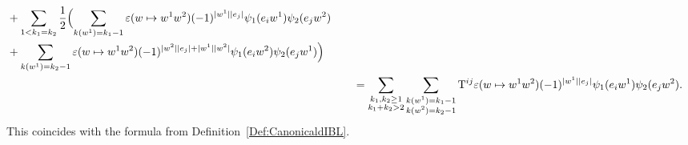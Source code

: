 \documentclass[\MainFolder/Text.tex]{subfiles}
\begin{document}
\begin{Example}
\begin{align*}
\begin{aligned}[t]
&{}+ \sum_{1< k_1 = k_2} \frac{1}{2} \Bigl(\sum_{k(w^1) = k_1 - 1} \varepsilon(w\mapsto w^1 w^2)(-1)^{|w^1||e_j|} \psi_1(e_i w^1) \psi_2(e_j w^2) \\ 
&{}+\sum_{k(w^1) = k_2 - 1} \varepsilon(w\mapsto w^1 w^2) (-1)^{|w^2||e_j| + |w^1||w^2|} \psi_1(e_i w^2) \psi_2(e_j w^1)\Bigr)\end{aligned}\\
&\qquad=\sum_{\substack{k_1, k_2 \ge 1 \\ k_1 + k_2 > 2}} \sum_{\substack{ k(w^1) = k_1 - 1 \\ k(w^2) = k_2 - 1}}  \mathrm{T}^{ij}\varepsilon(w \mapsto w^1 w^2) (-1)^{|w^1||e_j|} \psi_1(e_i w^1) \psi_2(e_j w^2).
\end{align*}
This coincides with the formula from Definition~\ref{Def:CanonicaldIBL}.


\end{Example}
\end{document}
